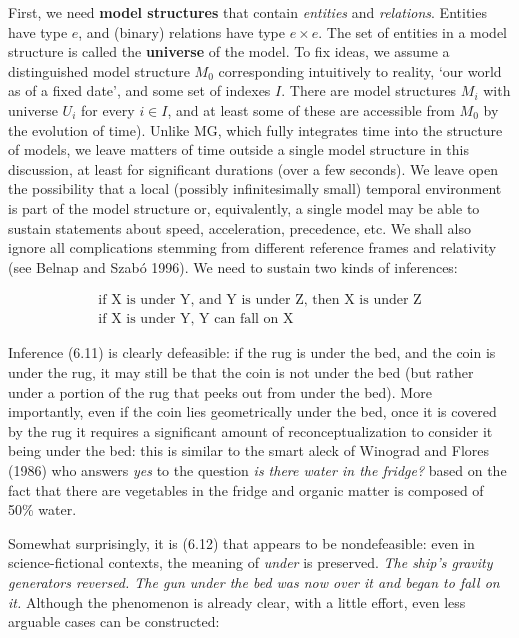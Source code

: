 First, we need {\bf model structures} that contain {\it entities} and {\it
  relations}.
Entities have type $e$, and (binary) relations have type $e\times e$. The set
of entities in a model structure is called the {\bf universe} of the model.
To fix ideas, we assume a distinguished model structure $M_0$ corresponding
intuitively to reality, `our world as of a fixed date', and some set of
indexes $I$. There are model structures $M_i$ with universe $U_i$ for every
$i\in I$, and at least some of these are accessible from $M_0$ by the
evolution of time). Unlike MG, which fully integrates time into the structure
of models, we leave matters of time outside a single model structure in this
discussion, at least for significant durations (over a few seconds). We leave
open the possibility that a local (possibly infinitesimally small) temporal
environment is part of the model structure or, equivalently, a single model
may be able to sustain statements about speed, acceleration, precedence,
etc. We shall also ignore all complications stemming from different reference
frames and relativity (see Belnap and Szab\'{o} 1996).  We need to sustain two
kinds of inferences:\nocite{Belnap:1996}

\begin{eqnarray}
\mbox{if X is under Y, and Y is under Z, then X is under Z}\\
\mbox{if X is under Y, Y can fall on X}
\end{eqnarray}

\smallskip\noindent Inference (6.11) is clearly defeasible: if the rug is
under the bed, and the coin is under the rug, it may still be that the coin is
not under the bed (but rather under a portion of the rug that peeks out from
under the bed).  More importantly, even if the coin lies geometrically under
the bed, once it is covered by the rug it requires a significant amount of
reconceptualization to consider it being under the bed: this is similar to the
smart aleck of Winograd and Flores (1986) who answers {\it yes} to the
question {\it is there water in the fridge?} based on the fact that there are
vegetables in the fridge and organic matter is composed of 50\%
water.\nocite{Winograd:1986}

Somewhat surprisingly, it is (6.12) that appears to be nondefeasible: even in
science-fictional contexts, the meaning of {\it under} is preserved. {\it The
  ship's gravity generators reversed. The gun under the bed was now over it
  and began to fall on it.} Although the phenomenon is already clear, with a
little effort, even less arguable cases can be constructed:

